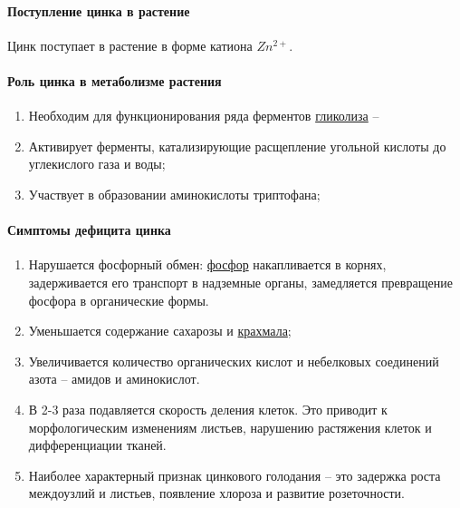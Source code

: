 \paragraph*{Поступление цинка в растение}Цинк поступает в растение в форме катиона $Zn^{2+}$. 

\paragraph*{Роль цинка в метаболизме растения}

\begin{enumerate}
\item Необходим для функционирования ряда ферментов \hyperlink{glycolysis}{гликолиза} -- 
\item Активирует ферменты, катализирующие расщепление угольной кислоты до углекислого газа и воды;
\item Участвует в образовании аминокислоты триптофана;
\end{enumerate}

\paragraph*{Симптомы дефицита цинка}

\begin{enumerate}
\item Нарушается фосфорный обмен: \hyperlink{phosphoros}{фосфор} накапливается в корнях, задерживается его транспорт в надземные органы, замедляется превращение фосфора в органические формы.
\item Уменьшается содержание сахарозы и \hyperlink{krahmal}{крахмала};
\item Увеличивается количество органических кислот и небелковых соединений азота -- амидов и аминокислот.
\item В 2-3 раза подавляется скорость деления клеток. Это приводит к морфологическим изменениям листьев, нарушению растяжения клеток и дифференциации тканей.
\item Наиболее характерный признак цинкового голодания -- это задержка роста междоузлий и листьев, появление хлороза и развитие розеточности.
\end{enumerate}


